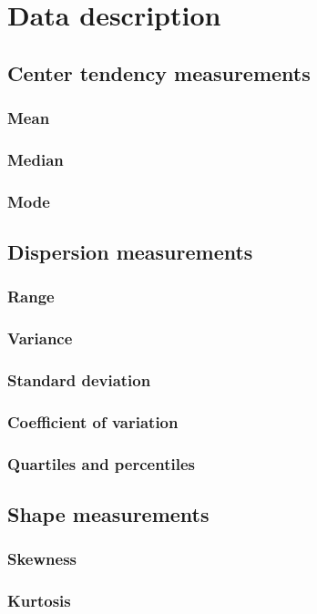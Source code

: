 \documentclass{report}
\begin{document}
\chapter{Data description}
	\section{Center tendency measurements}
		\subsection{Mean}
		\subsection{Median}
		\subsection{Mode}
	\section{Dispersion measurements}
		\subsection{Range}
		\subsection{Variance}
		\subsection{Standard deviation}
		\subsection{Coefficient of variation}
		\subsection{Quartiles and percentiles}
	\section{Shape measurements}
		\subsection{Skewness}
		\subsection{Kurtosis}
\end{document}
